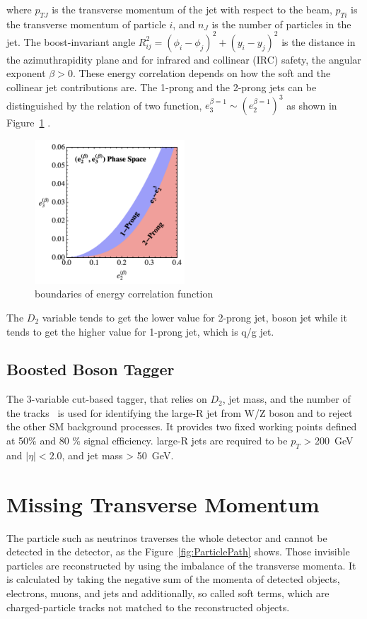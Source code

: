 where $p_{T J}$ is the transverse momentum of the jet with respect to the beam, $p_{T i}$ is the transverse momentum of particle $i$, and $n_{J}$ is the number of particles in the jet. 
The boost-invariant angle $R_{ij}^{2}=\left(\phi_{i}-\phi_{j}\right)^{2}+\left(y_{i}-y_{j}\right)^{2}$ is the distance in the azimuthrapidity plane and for infrared and collinear (IRC) safety, the angular exponent $\beta>0$. 
These energy correlation depends on how the soft and the collinear jet contributions are. The 1-prong and the 2-prong jets can be distinguished by the relation of two function, $e_{3}^{\beta=1} \sim\left(e_{2}^{\beta=1}\right)^{3}$ as shown in Figure~\ref{fig:phasespace23} \cite{Larkoski_2014}. 
\begin{figure}[tbp]
    \begin{center}
    \includegraphics[width=0.50\textwidth,keepaspectratio]{figures/Reconstruction/phasespace23}
    \caption{
    boundaries of energy correlation function \cite{Larkoski_2014}
    }
    \label{fig:phasespace23}
    \end{center}
\end{figure}
The $D_2$ variable tends to get the lower value for 2-prong jet, boson jet while it tends to get the higher value for 1-prong jet, which is q/g jet.
\subsection{Boosted Boson Tagger}
The 3-variable cut-based tagger, that relies on $D_2$, jet mass, and the number of the tracks~\cite{ATL-PHYS-PUB-2020-017} is used for identifying the large-R jet from W/Z boson and to reject the other SM background processes. It provides two fixed working points defined at 50\% and 80 \% signal efficiency. 
large-R jets are required to be $p_T$ > 200~GeV and $|\eta| <2.0$, and jet mass > 50~GeV.
\section{Missing Transverse Momentum}
The particle such as neutrinos traverses the whole detector and cannot be detected in the detector, as the Figure~\ref{fig:ParticlePath} shows. Those invisible particles are reconstructed by using the imbalance of the transverse momenta. It is calculated by taking the negative sum of the momenta of detected objects, electrons, muons, and jets and additionally, so called soft terms, which are charged-particle tracks not matched to the reconstructed objects\cite{PERF-2016-07}.
